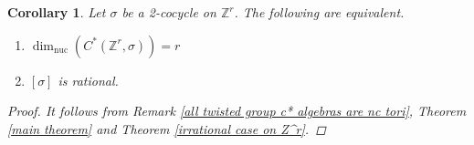 \documentclass{amsart}
\newtheorem{corollary}[theorem]{Corollary}
\theoremstyle{definition}
\newcommand{\Z}{\mathbb{Z}}
\DeclareMathOperator{\nuc}{nuc}
\newcommand{\dimnuc}{\dim_{\nuc}}
\begin{document}
\begin{corollary}\label{equivalene of rational and dimnuc=rank}
Let $\sigma$ be a 2-cocycle on $\Z^r$. The following are equivalent.
\begin{enumerate}[label=\roman*.]
    \item $\dimnuc(C^*(\Z^r,\sigma))=r$
    \item $[\sigma]$ is rational.
\end{enumerate}
\begin{proof}
 It follows from Remark \ref{all twisted group c* algebras are nc tori}, Theorem \ref{main theorem} and Theorem \ref{irrational case on Z^r}.  
\end{proof}
\end{corollary}


\small


\end{document}

